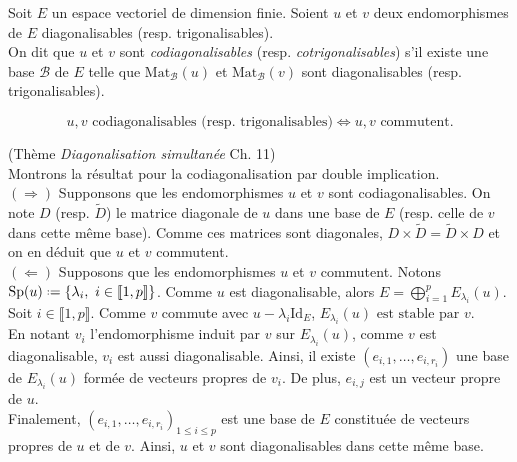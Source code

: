 \begin{defi}
    Soit $E$ un espace vectoriel de dimension finie. Soient $u$ et $v$ deux endomorphismes de $E$ diagonalisables (resp. trigonalisables). \\
    On dit que $u$ et $v$ sont \emph{codiagonalisables} (resp. \emph{cotrigonalisables}) s'il existe une base $\mathscr{B}$ de $E$ telle que $\mathrm{Mat}_\mathscr{B}(u)$ et $\mathrm{Mat}_\mathscr{B}(v)$ sont diagonalisables (resp. trigonalisables). 
\end{defi}

\begin{prop}
    $$u, v \text{ codiagonalisables (resp. trigonalisables)} \Longleftrightarrow u, v \text{ commutent}.$$
\end{prop}

\begin{preuve} \cite{acamanes} (Thème \emph{Diagonalisation simultanée} Ch. 11)\\
    Montrons la résultat pour la codiagonalisation par double implication. \\
    $(\Rightarrow)$ Supponsons que les endomorphismes $u$ et $v$ sont codiagonalisables. On note $D$ (resp. $\widetilde{D}$) le matrice diagonale de $u$ dans une base de $E$ (resp. celle de $v$ dans cette même base). Comme ces matrices sont diagonales, $D \times \widetilde{D} = \widetilde{D} \times D$ et on en déduit que $u$ et $v$ commutent. \\
    $(\Leftarrow)$ Supposons que les endomorphismes $u$ et $v$ commutent. Notons $\mathrm{Sp}(u) \defeq \{ \lambda_i,\ i \in \llbracket1, p \rrbracket \}$. Comme $u$ est diagonalisable, alors $E = \bigoplus\limits_{i = 1}^{p} E_{\lambda_i}(u)$. \\
    Soit $i \in \llbracket 1, p \rrbracket$. Comme $v$ commute avec $u - \lambda_i \mathrm{Id}_E$, $E_{\lambda_i}(u) \text{ est stable par } v$. \\
    En notant $v_i$ l'endomorphisme induit par $v$ sur $E_{\lambda_i}(u)$, comme $v$ est diagonalisable, $v_i$ est aussi diagonalisable. Ainsi, il existe $(e_{i, 1}, \dots, e_{i, r_i})$ une base de $E_{\lambda_i}(u)$ formée de vecteurs propres de $v_i$. De plus, $e_{i, j}$ est un vecteur propre de $u$. \\
    Finalement, $(e_{i, 1}, \dots, e_{i, r_i})_{1 \leqslant i \leqslant p}$ est une base de $E$ constituée de vecteurs propres de $u$ et de $v$. Ainsi, $u$ et $v$ sont diagonalisables dans cette même base. 
\end{preuve}


\marginnote[0cm]{
    \begin{kaobox}[frametitle=Endomorphisme induit]
    \end{kaobox}
}